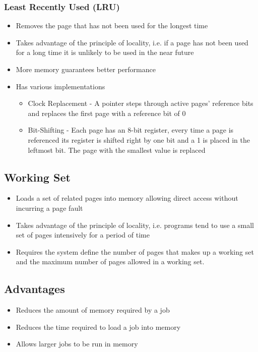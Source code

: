 \documentclass[12pt letter]{report}
\begin{document}
\subsubsection{Least Recently Used (LRU)}
\begin{itemize}
  \item Removes the page that has not been used for the longest time
  \item Takes advantage of the principle of locality, i.e. if a page has not been used for a long time it is unlikely to be used in the near future
  \item More memory guarantees better performance
  \item Has various implementations
        \begin{itemize}
          \item Clock Replacement - A pointer steps through active pages' reference bits and replaces the first page with a reference bit of 0
          \item Bit-Shifting - Each page has an 8-bit register, every time a page is referenced its register is shifted right by one bit and a 1 is placed in the leftmost bit. The page with the smallest value is replaced
        \end{itemize}
\end{itemize}

\subsection{Working Set}

\begin{itemize}
  \item Loads a set of related pages into memory allowing direct access without incurring a page fault
  \item Takes advantage of the principle of locality, i.e. programs tend to use a small set of pages intensively for a period of time
  \item Requires the system define the number of pages that makes up a working set and the maximum number of pages allowed in a working set.
\end{itemize}

\subsection{Advantages}
\begin{itemize}
  \item Reduces the amount of memory required by a job
  \item Reduces the time required to load a job into memory
  \item Allows larger jobs to be run in memory
\end{itemize}
\end{document}
